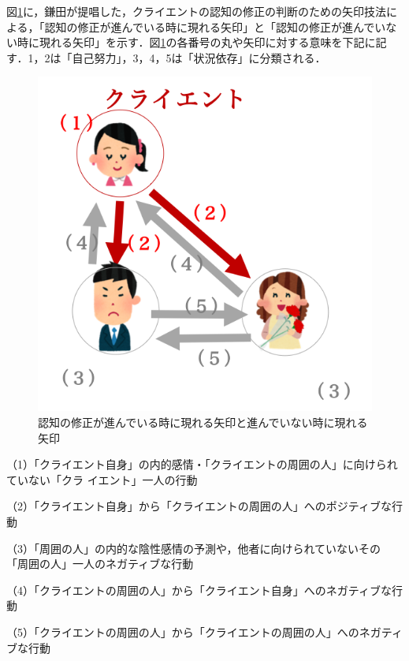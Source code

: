 \documentclass[shuuron]{kuee}
\begin{document}
図\ref{fig:arrow}に，鎌田\cite{鎌田穣2002臨床}が提唱した，クライエントの認知の修正の判断のための矢印技法による，「認知の修正が進んでいる時に現れる矢印」と「認知の修正が進んでいない時に現れる矢印」を示す．図\ref{fig:arrow}の各番号の丸や矢印に対する意味を下記に記す．1，2は「自己努力」，3，4，5は「状況依存」に分類される．

\begin{figure}
  \begin{center}
    \includegraphics[width=\linewidth]{arrow.png}
  \end{center}
  \caption{認知の修正が進んでいる時に現れる矢印と進んでいない時に現れる矢印}
  \label{fig:arrow}
\end{figure}


（1）「クライエント自身」の内的感情・「クライエントの周囲の人」に向けられていない「クラ
  イエント」一人の行動

（2）「クライエント自身」から「クライエントの周囲の人」へのポジティブな行動

（3）「周囲の人」の内的な陰性感情の予測や，他者に向けられていないその
  「周囲の人」一人のネガティブな行動

（4）「クライエントの周囲の人」から「クライエント自身」へのネガティブな行動

（5）「クライエントの周囲の人」から「クライエントの周囲の人」へのネガティブな行動
\end{document}
